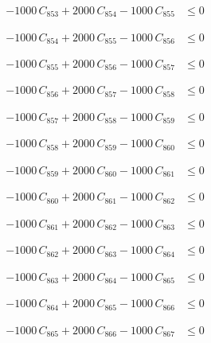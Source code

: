 \documentclass[a4paper,11pt]{article}
\begin{document}
\begin{align}
-1000\,C_{853} + 2000\,C_{854} - 1000\,C_{855} &\leq 0 \nonumber
\end{align}

\begin{align}
-1000\,C_{854} + 2000\,C_{855} - 1000\,C_{856} &\leq 0 \nonumber
\end{align}

\begin{align}
-1000\,C_{855} + 2000\,C_{856} - 1000\,C_{857} &\leq 0 \nonumber
\end{align}

\begin{align}
-1000\,C_{856} + 2000\,C_{857} - 1000\,C_{858} &\leq 0 \nonumber
\end{align}

\begin{align}
-1000\,C_{857} + 2000\,C_{858} - 1000\,C_{859} &\leq 0 \nonumber
\end{align}

\begin{align}
-1000\,C_{858} + 2000\,C_{859} - 1000\,C_{860} &\leq 0 \nonumber
\end{align}

\begin{align}
-1000\,C_{859} + 2000\,C_{860} - 1000\,C_{861} &\leq 0 \nonumber
\end{align}

\begin{align}
-1000\,C_{860} + 2000\,C_{861} - 1000\,C_{862} &\leq 0 \nonumber
\end{align}

\begin{align}
-1000\,C_{861} + 2000\,C_{862} - 1000\,C_{863} &\leq 0 \nonumber
\end{align}

\begin{align}
-1000\,C_{862} + 2000\,C_{863} - 1000\,C_{864} &\leq 0 \nonumber
\end{align}

\begin{align}
-1000\,C_{863} + 2000\,C_{864} - 1000\,C_{865} &\leq 0 \nonumber
\end{align}

\begin{align}
-1000\,C_{864} + 2000\,C_{865} - 1000\,C_{866} &\leq 0 \nonumber
\end{align}

\begin{align}
-1000\,C_{865} + 2000\,C_{866} - 1000\,C_{867} &\leq 0 \nonumber
\end{align}
\end{document}
